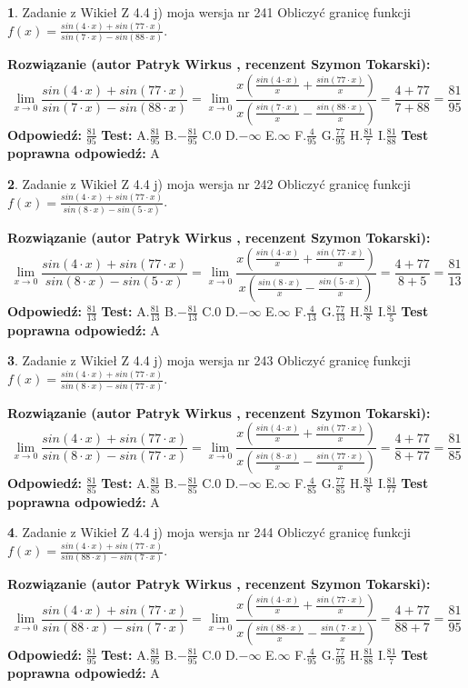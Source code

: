 \documentclass[12pt, a4paper]{article}
\theoremstyle{definition} %
\newtheorem{zad}{}
\newcommand{\zadStart}[1]{\begin{zad}#1\newline}
\newcommand{\zadStop}{\end{zad}}
\newcommand{\rozwStart}[2]{\noindent \textbf{Rozwiązanie (autor #1 , recenzent #2): }\newline}
\newcommand{\rozwStop}{\newline}
\newcommand{\odpStart}{\noindent \textbf{Odpowiedź:}\newline}
\newcommand{\odpStop}{\newline}
\newcommand{\testStart}{\noindent \textbf{Test:}\newline}
\newcommand{\testStop}{\newline}
\newcommand{\kluczStart}{\noindent \textbf{Test poprawna odpowiedź:}\newline}
\newcommand{\kluczStop}{\newline}
\begin{document}
\zadStart{Zadanie z Wikieł Z 4.4 j) moja wersja nr 241}
Obliczyć granicę funkcji $f(x)=\frac{sin(4\cdot x) +sin(77\cdot x)}{sin(7\cdot x) -sin(88\cdot x)}$.
\zadStop
\rozwStart{Patryk Wirkus}{Szymon Tokarski}
$$\lim\limits_{x\to 0}\frac{sin(4\cdot x) +sin(77\cdot x)}{sin(7\cdot x) -sin(88\cdot x)}=\lim\limits_{x\to 0}\frac{x(\frac{sin(4\cdot x)}{x}+\frac{sin(77\cdot x)}{x})}{x(\frac{sin(7\cdot x)}{x}-\frac{sin(88\cdot x)}{x})}=\frac{4+77}{7+88} = \frac{81}{95}$$
\rozwStop
\odpStart
$\frac{81}{95}$
\odpStop
\testStart
A.$\frac{81}{95}$
B.$-\frac{81}{95}$
C.$0$
D.$-\infty$
E.$\infty$
F.$\frac{4}{95}$
G.$\frac{77}{95}$
H.$\frac{81}{7}$
I.$\frac{81}{88}$
\testStop
\kluczStart
A
\kluczStop



\zadStart{Zadanie z Wikieł Z 4.4 j) moja wersja nr 242}
Obliczyć granicę funkcji $f(x)=\frac{sin(4\cdot x) +sin(77\cdot x)}{sin(8\cdot x) -sin(5\cdot x)}$.
\zadStop
\rozwStart{Patryk Wirkus}{Szymon Tokarski}
$$\lim\limits_{x\to 0}\frac{sin(4\cdot x) +sin(77\cdot x)}{sin(8\cdot x) -sin(5\cdot x)}=\lim\limits_{x\to 0}\frac{x(\frac{sin(4\cdot x)}{x}+\frac{sin(77\cdot x)}{x})}{x(\frac{sin(8\cdot x)}{x}-\frac{sin(5\cdot x)}{x})}=\frac{4+77}{8+5} = \frac{81}{13}$$
\rozwStop
\odpStart
$\frac{81}{13}$
\odpStop
\testStart
A.$\frac{81}{13}$
B.$-\frac{81}{13}$
C.$0$
D.$-\infty$
E.$\infty$
F.$\frac{4}{13}$
G.$\frac{77}{13}$
H.$\frac{81}{8}$
I.$\frac{81}{5}$
\testStop
\kluczStart
A
\kluczStop



\zadStart{Zadanie z Wikieł Z 4.4 j) moja wersja nr 243}
Obliczyć granicę funkcji $f(x)=\frac{sin(4\cdot x) +sin(77\cdot x)}{sin(8\cdot x) -sin(77\cdot x)}$.
\zadStop
\rozwStart{Patryk Wirkus}{Szymon Tokarski}
$$\lim\limits_{x\to 0}\frac{sin(4\cdot x) +sin(77\cdot x)}{sin(8\cdot x) -sin(77\cdot x)}=\lim\limits_{x\to 0}\frac{x(\frac{sin(4\cdot x)}{x}+\frac{sin(77\cdot x)}{x})}{x(\frac{sin(8\cdot x)}{x}-\frac{sin(77\cdot x)}{x})}=\frac{4+77}{8+77} = \frac{81}{85}$$
\rozwStop
\odpStart
$\frac{81}{85}$
\odpStop
\testStart
A.$\frac{81}{85}$
B.$-\frac{81}{85}$
C.$0$
D.$-\infty$
E.$\infty$
F.$\frac{4}{85}$
G.$\frac{77}{85}$
H.$\frac{81}{8}$
I.$\frac{81}{77}$
\testStop
\kluczStart
A
\kluczStop



\zadStart{Zadanie z Wikieł Z 4.4 j) moja wersja nr 244}
Obliczyć granicę funkcji $f(x)=\frac{sin(4\cdot x) +sin(77\cdot x)}{sin(88\cdot x) -sin(7\cdot x)}$.
\zadStop
\rozwStart{Patryk Wirkus}{Szymon Tokarski}
$$\lim\limits_{x\to 0}\frac{sin(4\cdot x) +sin(77\cdot x)}{sin(88\cdot x) -sin(7\cdot x)}=\lim\limits_{x\to 0}\frac{x(\frac{sin(4\cdot x)}{x}+\frac{sin(77\cdot x)}{x})}{x(\frac{sin(88\cdot x)}{x}-\frac{sin(7\cdot x)}{x})}=\frac{4+77}{88+7} = \frac{81}{95}$$
\rozwStop
\odpStart
$\frac{81}{95}$
\odpStop
\testStart
A.$\frac{81}{95}$
B.$-\frac{81}{95}$
C.$0$
D.$-\infty$
E.$\infty$
F.$\frac{4}{95}$
G.$\frac{77}{95}$
H.$\frac{81}{88}$
I.$\frac{81}{7}$
\testStop
\kluczStart
A
\kluczStop
\end{document}
